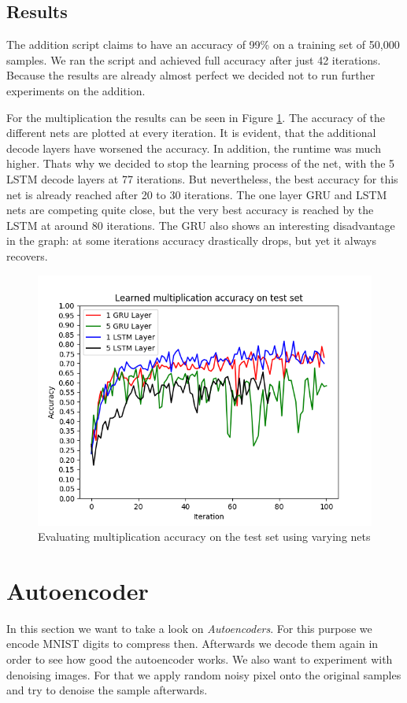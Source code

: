 \documentclass{article}[]
\begin{document}
\subsection{Results}
The addition script claims to have an accuracy of 99\% on a training set of 50,000 samples.
We ran the script and achieved full accuracy after just 42 iterations.
Because the results are already almost perfect we decided not to run further experiments on the addition.


For the multiplication the results can be seen in Figure \ref{fig:multiply}.
The accuracy of the different nets are plotted at every iteration.
It is evident, that the additional decode layers have worsened the accuracy.
In addition, the runtime was much higher.
Thats why we decided to stop the learning process of the net, with the 5 LSTM decode layers at 77 iterations.
But nevertheless, the best accuracy for this net is already reached after 20 to 30 iterations.
The one layer GRU and LSTM nets are competing quite close, but the very best accuracy is reached by the LSTM at around 80 iterations.
The GRU also shows an interesting disadvantage in the graph: at some iterations accuracy drastically drops, but yet it always recovers.

\begin{figure}[H]
\centering
\includegraphics[width=1\linewidth]{img/multiply}
\caption{Evaluating multiplication accuracy on the test set using varying nets}
\label{fig:multiply}
\end{figure}

\section{Autoencoder}
\label{sec:autoencoder}
In this section we want to take a look on \emph{Autoencoders}.
For this purpose we encode MNIST digits to compress then.
Afterwards we decode them again in order to see how good the autoencoder works.
We also want to experiment with denoising images.
For that we apply random noisy pixel onto the original samples and try to denoise the sample afterwards.
\end{document}
